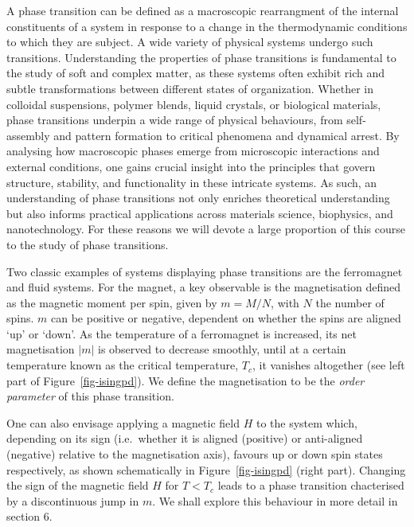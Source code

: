 \documentclass[
  letterpaper,
  enabledeprecatedfontcommands]{report}
\begin{document}
A phase transition can be defined as a macroscopic rearrangment of the
internal constituents of a system in response to a change in the
thermodynamic conditions to which they are subject. A wide variety of
physical systems undergo such transitions. Understanding the properties
of phase transitions is fundamental to the study of soft and complex
matter, as these systems often exhibit rich and subtle transformations
between different states of organization. Whether in colloidal
suspensions, polymer blends, liquid crystals, or biological materials,
phase transitions underpin a wide range of physical behaviours, from
self-assembly and pattern formation to critical phenomena and dynamical
arrest. By analysing how macroscopic phases emerge from microscopic
interactions and external conditions, one gains crucial insight into the
principles that govern structure, stability, and functionality in these
intricate systems. As such, an understanding of phase transitions not
only enriches theoretical understanding but also informs practical
applications across materials science, biophysics, and nanotechnology.
For these reasons we will devote a large proportion of this course to
the study of phase transitions.

Two classic examples of systems displaying phase transitions are the
ferromagnet and fluid systems. For the magnet, a key observable is the
magnetisation defined as the magnetic moment per spin, given by
\(m=M/N\), with \(N\) the number of spins. \(m\) can be positive or
negative, dependent on whether the spins are aligned `up' or `down'. As
the temperature of a ferromagnet is increased, its net magnetisation
\(|m|\) is observed to decrease smoothly, until at a certain temperature
known as the critical temperature, \(T_c\), it vanishes altogether (see
left part of Figure~\ref{fig-isingpd}). We define the magnetisation to
be the \emph{order parameter} of this phase transition.

One can also envisage applying a magnetic field \(H\) to the system
which, depending on its sign (i.e.~whether it is aligned (positive) or
anti-aligned (negative) relative to the magnetisation axis), favours up
or down spin states respectively, as shown schematically in
Figure~\ref{fig-isingpd} (right part). Changing the sign of the magnetic
field \(H\) for \(T<T_c\) leads to a phase transition chacterised by a
discontinuous jump in \(m\). We shall explore this behaviour in more
detail in section 6.
\end{document}
